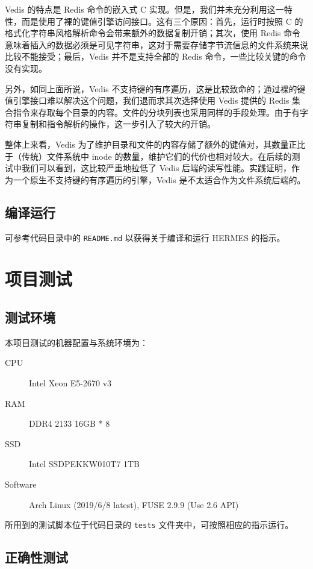 \documentclass{ctexart}
\begin{document}
Vedis 的特点是 Redis 命令的嵌入式 C 实现。但是，我们并未充分利用这一特性，而是使用了裸的键值引擎访问接口。这有三个原因：首先，运行时按照 C 的格式化字符串风格解析命令会带来额外的数据复制开销；其次，使用 Redis 命令意味着插入的数据必须是可见字符串，这对于需要存储字节流信息的文件系统来说比较不能接受；最后，Vedis 并不是支持全部的 Redis 命令，一些比较关键的命令没有实现。

另外，如同上面所说，Vedis 不支持键的有序遍历，这是比较致命的；通过裸的键值引擎接口难以解决这个问题，我们退而求其次选择使用 Vedis 提供的 Redis 集合指令来存取每个目录的内容。文件的分块列表也采用同样的手段处理。由于有字符串复制和指令解析的操作，这一步引入了较大的开销。

整体上来看，Vedis 为了维护目录和文件的内容存储了额外的键值对，其数量正比于（传统）文件系统中 inode 的数量，维护它们的代价也相对较大。在后续的测试中我们可以看到，这比较严重地拉低了 Vedis 后端的读写性能。实践证明，作为一个原生不支持键的有序遍历的引擎，Vedis 是不太适合作为文件系统后端的。

\subsection{编译运行}

可参考代码目录中的 \texttt{README.md} 以获得关于编译和运行 HERMES 的指示。

\section{项目测试}

\subsection{测试环境}

本项目测试的机器配置与系统环境为：

\begin{description}
    \item[CPU] Intel Xeon E5-2670 v3
    \item[RAM] DDR4 2133 16GB * 8
    \item[SSD] Intel SSDPEKKW010T7 1TB
    \item[Software] Arch Linux (2019/6/8 latest), FUSE 2.9.9 (Use 2.6 API)
\end{description}

所用到的测试脚本位于代码目录的 \texttt{tests} 文件夹中，可按照相应的指示运行。

\subsection{正确性测试}
\end{document}
